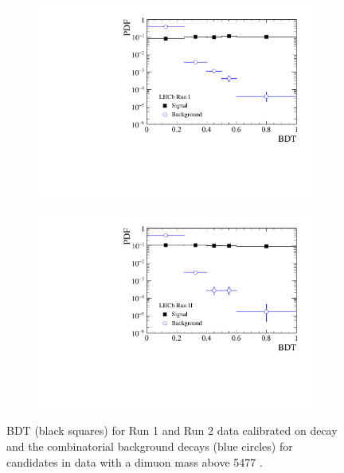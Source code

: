 \begin{figure}[htbp]
    \centering
   \begin{subfigure}[b]{0.48\textwidth}
        \includegraphics[width= \textwidth]{./Figs/BFAnalysis/C_macros/BDT_calibration_Run1.pdf}
    \end{subfigure}
    \begin{subfigure}[b]{0.48\textwidth}
       \includegraphics[width=\textwidth]{./Figs/BFAnalysis/C_macros/BDT_calibration_Run2.pdf}
   \end{subfigure}
    \caption{\bmumu BDT \pdfs (black squares) for Run 1 and Run 2 data calibrated on \bdkpi decay and the combinatorial background decays (blue circles) for \bmumu candidates in data with a dimuon mass above 5477 \mevcc. }
    \label{fig:BDTpdfs}
\end{figure}


